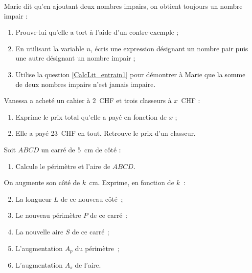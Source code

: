 \begin{exercice}
Marie dit qu'en ajoutant deux nombres impairs, on obtient toujours un nombre impair :
\begin{enumerate}
 \item Prouve-lui qu'elle a tort à l'aide d'un contre-exemple ;
 \item En utilisant la variable $n$, écris une expression désignant un nombre pair puis une autre désignant un nombre impair ; \label{CalcLit_entrain1}
 \item Utilise la question \ref{CalcLit_entrain1} pour démontrer à Marie que la somme de deux nombres impairs n'est jamais impaire.
 \end{enumerate}
\end{exercice}


\begin{exercice}
Vanessa a acheté un cahier à 2 CHF et trois classeurs à $x$ CHF :
\begin{enumerate}
 \item Exprime le prix total qu'elle a payé en fonction de $x$ ;
 \item Elle a payé 23 CHF en tout. Retrouve le prix d'un classeur.
 \end{enumerate}
\end{exercice}


\begin{exercice}
Soit $ABCD$ un carré de 5 cm de côté :
\begin{enumerate}
 \item Calcule le périmètre et l'aire de $ABCD$.
 \end{enumerate}
On augmente son côté de $k$ cm. Exprime, en fonction de $k$ :
\begin{enumerate}
\setcounter{enumi}{1}
 \item La longueur $L$ de ce nouveau côté ;
 \item Le nouveau périmètre $P$ de ce carré ;
 \item La nouvelle aire $S$ de ce carré ;
 \item L'augmentation $A_p$ du périmètre ;
 \item L'augmentation $A_s$ de l'aire.
 \end{enumerate}
\end{exercice}